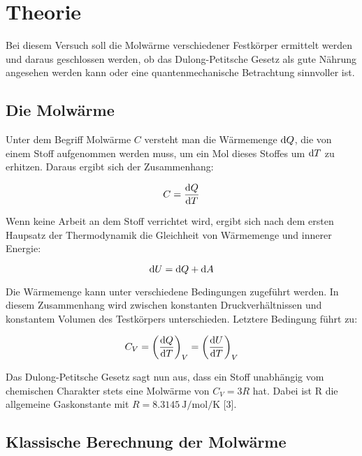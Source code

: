 \section{Theorie}
\label{sec:Theorie}

Bei diesem Versuch soll die Molwärme verschiedener Festkörper
ermittelt werden und daraus geschlossen werden, ob das 
Dulong-Petitsche Gesetz als gute Nährung angesehen werden kann
oder eine quantenmechanische Betrachtung sinnvoller ist. 

\subsection{Die Molwärme}
\label{sec:Molwaerme}

Unter dem Begriff Molwärme $C$ versteht man die Wärmemenge $\mathop{}\!\mathrm{d} Q$, 
die von einem Stoff aufgenommen werden muss, um ein Mol 
dieses Stoffes um $\mathop{}\!\mathrm{d} T$ zu erhitzen. Daraus ergibt sich der 
Zusammenhang:

\begin{equation*}
C = \frac{\mathop{}\!\mathrm{d} Q}{\mathop{}\!\mathrm{d} T}
\end{equation*}

Wenn keine Arbeit an dem Stoff verrichtet wird, ergibt sich
nach dem ersten Haupsatz der Thermodynamik die Gleichheit 
von Wärmemenge und innerer Energie: 

\begin{equation*}
\mathop{}\!\mathrm{d} U = \mathop{}\!\mathrm{d} Q + \mathop{}\!\mathrm{d} A
\end{equation*}

Die Wärmemenge kann unter verschiedene Bedingungen zugeführt 
werden. In diesem Zusammenhang wird zwischen konstanten 
Druckverhältnissen und konstantem Volumen des Testkörpers 
unterschieden. Letztere Bedingung führt zu: 

\begin{equation}
C_V = \left(\frac{\mathop{}\!\mathrm{d} Q}{\mathop{}\!\mathrm{d} T}\right)_V = \left(\frac{\mathop{}\!\mathrm{d} U}{\mathop{}\!\mathrm{d} T}\right)_V
\label{eqn:Molwaerme}
\end{equation}

Das Dulong-Petitsche Gesetz sagt nun aus, dass ein Stoff 
unabhängig vom chemischen Charakter stets eine Molwärme von
$C_V = 3 R$ hat. Dabei ist R die allgemeine Gaskonstante mit 
$R = \SI{8.3145}{\joule\per\mol\per\kelvin}$ [3].

\subsection{Klassische Berechnung der Molwärme}
\label{sec:Klassisch}

